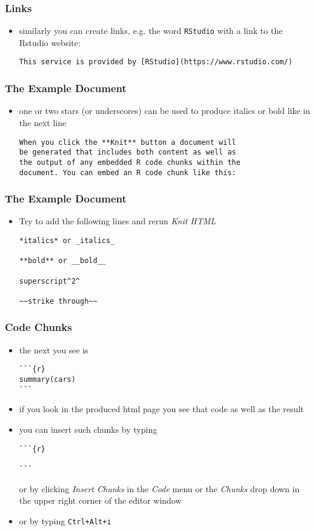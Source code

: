 \begin{frame}[fragile]\frametitle{Links}
  \begin{itemize}
  \item similarly you can create links, e.g. the word \texttt{RStudio} with a link to the Rstudio website: 
\begin{verbatim}
This service is provided by [RStudio](https://www.rstudio.com/)
\end{verbatim}
  \end{itemize}
\end{frame}


\begin{frame}[fragile]\frametitle{The Example Document}
  \begin{itemize}
  \item one or two stars (or underscores) can be used to produce italics or bold like in the next line
\begin{verbatim}
When you click the **Knit** button a document will
be generated that includes both content as well as
the output of any embedded R code chunks within the
document. You can embed an R code chunk like this:
\end{verbatim}

  \end{itemize}
\end{frame}

\begin{frame}[fragile]\frametitle{The Example Document}
  \begin{itemize}
  \item Try to add the following lines and rerun \textit{Knit HTML}
    
\begin{verbatim}
*italics* or _italics_

**bold** or __bold__

superscript^2^

~~strike through~~
\end{verbatim}
  
  \end{itemize}
\end{frame}


\begin{frame}[fragile]\frametitle{Code Chunks}
  \begin{itemize}
  \item the next you see is
    \small
\begin{verbatim}
```{r}
summary(cars)
```
\end{verbatim}
    \normalsize
  \item if you look in the produced html page you see that code as well as the result
  \item you can insert such chunks by typing
        \small
\begin{verbatim}
```{r}

```
\end{verbatim}
        \normalsize
    or by clicking \textit{Insert Chunks} in the \textit{Code} menu or the \textit{Chunks} drop down in the upper right corner of the editor window
  \item or by typing \texttt{Ctrl+Alt+i}
  \end{itemize}
\end{frame}


